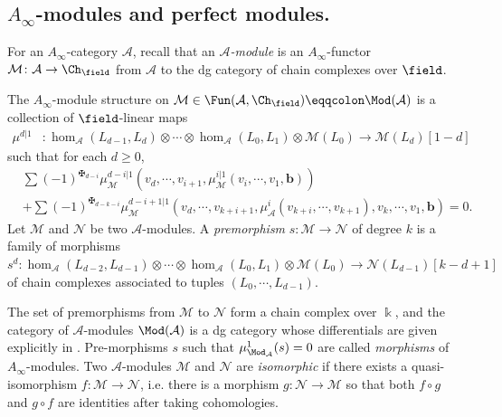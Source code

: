 \subsection[modules and perfect modules]{$A_{\infty}$-modules and perfect modules.} For an $A_{\infty}$-category $\mathcal{A}$, recall that an \emph{$\mathcal{A}$-module} is an $A_{\infty}$-functor $\mathcal{M}\colon\mathcal{A}\to\Ch_{\field}$ from $\mathcal{A}$ to the dg category of chain complexes over $\field$.
\begin{dfn}\label{dfn:A-inf-module}
     The $A_{\infty}$-module structure on $\mathcal{M}\in\Fun (\mathcal{A},\Ch_{\field})\eqqcolon\Mod (\mathcal{A})$ is a collection of $\field$-linear maps
    \begin{align*}
    \mu^{d\vert 1}&\colon\hom_{\mathcal{A}} (L_{d-1},L_d)\otimes\dotsb\otimes\hom_{\mathcal{A}} (L_0, L_1)\otimes\mathcal{M} (L_0)\to\mathcal{M} (L_d) [1-d]
    \end{align*}
    such that for each $d\geq 0$, \begin{equation}\label{eq:A-inf-bimodule-equation}\begin{aligned}
        &\sum (-1)^{\maltese_{d-i}}\mu_{\mathcal{M}}^{d-i\vert 1}(v_d,\dotsb,v_{i+1},\mu_{\mathcal{M}}^{i\vert 1} (v_i,\dotsb, v_1,\mathbf{b}))\\ 
        &+\sum (-1)^{\maltese_{d-k-i}}\mu_{\mathcal{M}}^{d-i+1\vert 1}(v_d,\dotsb, v_{k+i+1},\mu_{\mathcal{A}}^i (v_{k+i},\dotsb,v_{k+1}),v_k,\dotsb, v_1,\mathbf{b})=0.
    \end{aligned}\end{equation}
    Let $\mathcal{M}$ and $\mathcal{N}$ be two $\mathcal{A}$-modules.
    A \emph{premorphism} $s\colon\mathcal{M}\to\mathcal{N}$ of degree $k$ is a family of morphisms
    $s^d\colon\hom_{\mathcal A}(L_{d-2},L_{d-1})\otimes\dotsb\otimes\hom_{\mathcal A}(L_0,L_1)\otimes\mathcal M(L_0)\longrightarrow\mathcal N(L_{d-1})[k-d+1]$
    of chain complexes associated to tuples $(L_0,\dotsb, L_{d-1})$.\par
    The set of premorphisms from $\mathcal{M}$ to $\mathcal{N}$ form a chain complex over $\Bbbk$, and the category of $\mathcal{A}$-modules $\Mod (\mathcal{A})$ is a dg category whose differentials are given explicitly in \cite[page 20]{Seidel08}. Pre-morphisms $s$ such that $\mu^1_{\Mod_{\mathcal{A}}} (s)=0$ are called \emph{morphisms} of $A_{\infty}$-modules. Two $\mathcal{A}$-modules $\mathcal{M}$ and $\mathcal{N}$ are \emph{isomorphic} if there exists a quasi-isomorphism $f\colon\mathcal{M}\to\mathcal{N}$, i.e. there is a morphism $g\colon\mathcal{N}\to\mathcal{M}$ so that both $f\circ g$ and $g\circ f$ are identities after taking cohomologies.
\end{dfn}
